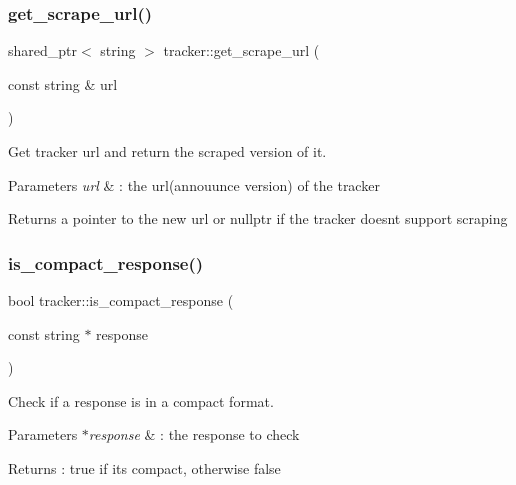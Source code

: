\subsubsection{\texorpdfstring{get\+\_\+scrape\+\_\+url()}{get\_scrape\_url()}}
{\footnotesize\ttfamily shared\+\_\+ptr$<$ string $>$ tracker\+::get\+\_\+scrape\+\_\+url (\begin{DoxyParamCaption}\item[{const string \&}]{url }\end{DoxyParamCaption})}



Get tracker url and return the scraped version of it. 


\begin{DoxyParams}{Parameters}
{\em url} & \+: the url(annouunce version) of the tracker \\
\hline
\end{DoxyParams}
\begin{DoxyReturn}{Returns}
a pointer to the new url or nullptr if the tracker doesn\textquotesingle{}t support scraping 
\end{DoxyReturn}
\mbox{\label{namespacetracker_ae542bb4bf17f34b8cadc3a4ae2f5ced2}} 
\subsubsection{\texorpdfstring{is\+\_\+compact\+\_\+response()}{is\_compact\_response()}}
{\footnotesize\ttfamily bool tracker\+::is\+\_\+compact\+\_\+response (\begin{DoxyParamCaption}\item[{const string $\ast$}]{response }\end{DoxyParamCaption})}



Check if a response is in a compact format. 


\begin{DoxyParams}{Parameters}
{\em $\ast$response} & \+: the response to check \\
\hline
\end{DoxyParams}
\begin{DoxyReturn}{Returns}
\+: true if it\textquotesingle{}s compact, otherwise false 
\end{DoxyReturn}
\mbox{\label{namespacetracker_a237de4c8b0282af2d59cd5d0b7bfd1fd}} 
